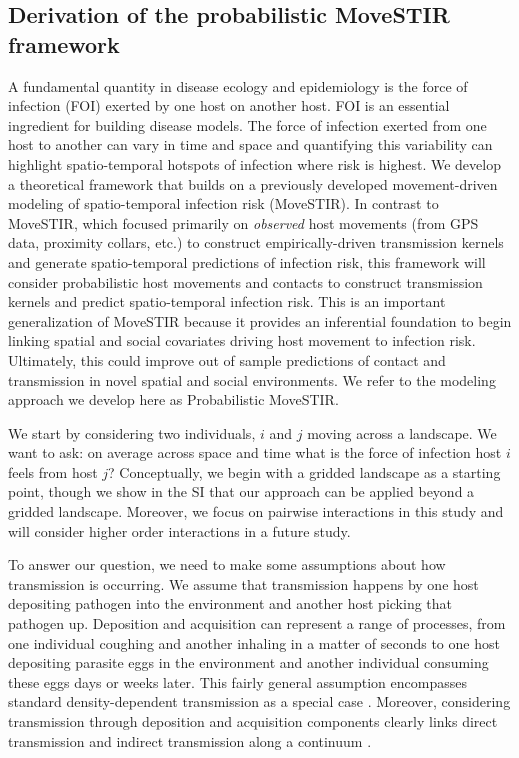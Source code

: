 \documentclass[letterpaper]{article}
\begin{document}
\subsection*{Derivation of the probabilistic MoveSTIR framework}

A fundamental quantity in disease ecology and epidemiology is the force of infection (FOI) exerted by one host on another host. FOI is an essential ingredient for building disease models.  The force of infection exerted from one host to another can vary in time and space and quantifying this variability can highlight spatio-temporal hotspots of infection where risk is highest.  We develop a theoretical framework that builds on a previously developed movement-driven modeling of spatio-temporal infection risk (MoveSTIR).  In contrast to MoveSTIR, which focused primarily on \emph{observed} host movements (from GPS data, proximity collars, etc.) to construct empirically-driven transmission kernels and generate spatio-temporal predictions of infection risk, this framework will consider probabilistic host movements and contacts to construct transmission kernels and predict spatio-temporal infection risk. This is an important generalization of MoveSTIR because it provides an inferential foundation to begin linking spatial and social covariates driving host movement to infection risk.  Ultimately, this could improve out of sample predictions of contact and transmission in novel spatial and social environments.  We refer to the modeling approach we develop here as Probabilistic MoveSTIR.     

We start by considering two individuals, $i$ and $j$ moving across a landscape.  We want to ask: on average across space and time what is the force of infection host $i$ feels from host $j$?   Conceptually, we begin with a gridded landscape as a starting point, though we show in the SI that our approach can be applied beyond a gridded landscape.  Moreover, we focus on pairwise interactions in this study and will consider higher order interactions in a future study.   

To answer our question, we need to make some assumptions about how transmission is occurring.  We assume that transmission happens by one host depositing pathogen into the environment and another host picking that pathogen up.  Deposition and acquisition can represent a range of processes, from one individual coughing and another inhaling in a matter of seconds to one host depositing parasite eggs in the environment and another individual consuming these eggs days or weeks later.  This fairly general assumption encompasses standard density-dependent transmission as a special case \citep{Cortez2021}.  Moreover, considering transmission through deposition and acquisition components clearly links direct transmission and indirect transmission along a continuum \citep{Wilber2022}.  
\end{document}
